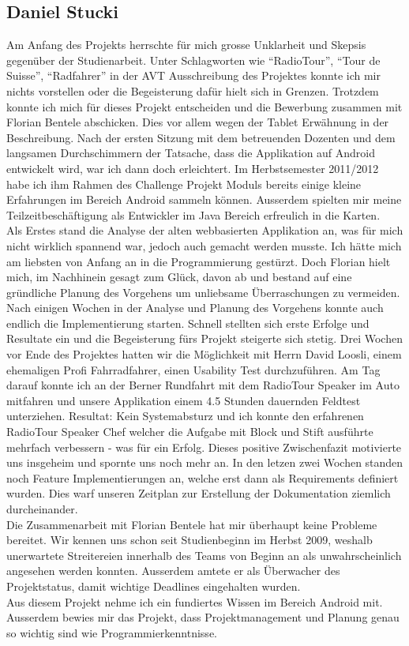 \subsection{Daniel Stucki}
Am Anfang des Projekts herrschte für mich grosse Unklarheit und Skepsis gegenüber der Studienarbeit. Unter Schlagworten wie "`RadioTour"', "`Tour de Suisse"', "`Radfahrer"' in der AVT Ausschreibung des Projektes konnte ich mir nichts vorstellen oder die Begeisterung dafür hielt sich in Grenzen. Trotzdem konnte ich mich für dieses Projekt entscheiden und die Bewerbung zusammen mit Florian Bentele abschicken. Dies vor allem wegen der Tablet Erwähnung in der Beschreibung. Nach der ersten Sitzung mit dem betreuenden Dozenten und dem langsamen Durchschimmern der Tatsache, dass die Applikation auf Android entwickelt wird, war ich dann doch erleichtert. Im Herbstsemester 2011/2012 habe ich ihm Rahmen des Challenge Projekt Moduls bereits einige kleine Erfahrungen im Bereich Android sammeln können. Ausserdem spielten mir meine Teilzeitbeschäftigung als Entwickler im Java Bereich erfreulich in die Karten.
\\
Als Erstes stand die Analyse der alten webbasierten Applikation an, was für mich nicht wirklich spannend war, jedoch auch gemacht werden musste. Ich hätte mich am liebsten von Anfang an in die Programmierung gestürzt. Doch Florian hielt mich, im Nachhinein gesagt zum Glück, davon ab und bestand auf eine gründliche Planung des Vorgehens um unliebsame Überraschungen zu vermeiden. Nach einigen Wochen in der Analyse und Planung des Vorgehens konnte auch endlich die Implementierung starten. Schnell stellten sich erste Erfolge und Resultate ein und die Begeisterung fürs Projekt steigerte sich stetig. Drei Wochen vor Ende des Projektes hatten wir die Möglichkeit mit Herrn David Loosli, einem ehemaligen Profi Fahrradfahrer, einen Usability Test durchzuführen. Am Tag darauf konnte ich an der Berner Rundfahrt mit dem RadioTour Speaker im Auto mitfahren und unsere Applikation einem 4.5 Stunden dauernden Feldtest unterziehen. Resultat: Kein Systemabsturz und ich konnte den erfahrenen RadioTour Speaker Chef welcher die Aufgabe mit Block und Stift ausführte mehrfach verbessern - was für ein Erfolg. Dieses positive Zwischenfazit motivierte uns insgeheim und spornte uns noch mehr an. In den letzen zwei Wochen standen noch Feature Implementierungen an, welche erst dann als Requirements definiert wurden. Dies warf unseren Zeitplan zur Erstellung der Dokumentation ziemlich durcheinander.
\\
Die Zusammenarbeit mit Florian Bentele hat mir überhaupt keine Probleme bereitet. Wir kennen uns schon seit Studienbeginn im Herbst 2009, weshalb unerwartete Streitereien innerhalb des Teams von Beginn an als unwahrscheinlich angesehen werden konnten. Ausserdem amtete er als Überwacher des Projektstatus, damit wichtige Deadlines eingehalten wurden.
\\
Aus diesem Projekt nehme ich ein fundiertes Wissen im Bereich Android mit. Ausserdem bewies mir das Projekt, dass Projektmanagement und Planung genau so wichtig sind wie Programmierkenntnisse.
 
